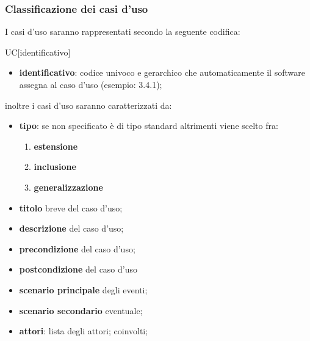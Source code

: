 		\subsubsection{Classificazione dei casi d'uso}
		I casi d'uso saranno rappresentati secondo la seguente codifica:
		\begin{center}
			UC[identificativo]
		\end{center}
		\begin{itemize}
			\item \textbf{identificativo}: codice univoco e gerarchico che automaticamente il software assegna al caso d'uso (esempio: 3.4.1);
		\end{itemize}
		inoltre i casi d'uso saranno caratterizzati da:
		\begin{itemize}
			\item \textbf{tipo}: se non specificato è di tipo standard altrimenti viene scelto fra:
			\begin{enumerate}
				\item \textbf{estensione}
				\item \textbf{inclusione}
				\item \textbf{generalizzazione}
			\end{enumerate}
			\item \textbf{titolo} breve del caso d'uso;
			\item \textbf{descrizione} del caso d'uso;
			\item \textbf{precondizione} del caso d'uso;
			\item \textbf{postcondizione} del caso d'uso 
			\item \textbf{scenario principale} degli eventi;
			\item \textbf{scenario secondario} eventuale;
			\item \textbf{attori}: lista degli attori; coinvolti;
		\end{itemize}